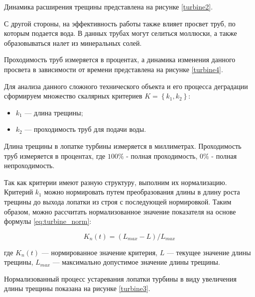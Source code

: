 
Динамика расширения трещины представлена на рисунке \ref{turbine2}.


С другой стороны, на эффективность работы также влияет просвет труб, по которым подается вода.
В данных трубах могут селиться моллюски, а также образовываться налет из минеральных солей.

Проходимость труб измеряется в процентах, а динамика изменения данного просвета в зависимости от времени представлена на рисунке \ref{turbine4}.


Для анализа данного сложного технического объекта и его процесса деградации сформируем множество скалярных критериев $K=\left\{k_1,k_2\right\}$:
\begin{itemize}
    \item $k_1$ --- длина трещины;
    \item $k_2$ --- проходимость труб для подачи воды.
\end{itemize}

Длина трещины в лопатке турбины измеряется в миллиметрах.
Проходимость труб измеряется в процентах, где $100\%$ - полная проходимость, $0\%$ - полная непроходимость.

Так как критерии имеют разную структуру, выполним их нормализацию. 
Критерий $k_1$ можно нормировать путем преобразования длины в длину роста трещины до выхода лопатки из строя с последующей нормировкой.
Таким образом, можно рассчитать нормализованное значение показателя на основе формулы \ref{eq:turbine_norm}:

\begin{equation} \label{eq:turbine_norm}
    K_n(t)=(L_{max} - L)/L_{max}
\end{equation}
\vspace{0.5em}

\noindent
где $K_n(t)$ --- нормированное значение критерия,
$L$ --- текущее значение длины трещины, 
$L_{max}$ --- максимально допустимое значение длины трещины.

Нормализованный процесс устаревания лопатки турбины в виду увеличения длины трещины показана на рисунке \ref{turbine3}.


